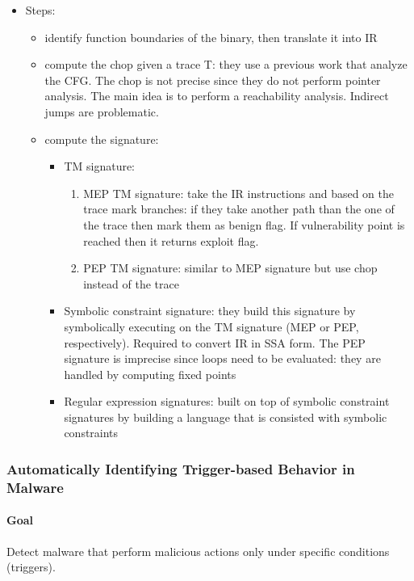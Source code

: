 \begin{itemize}
\begin{itemize}
    \end{itemize}
  \item Steps:
    \begin{itemize}
      \item identify function boundaries of the binary, then translate it into IR
      \item compute the chop given a trace T: they use a previous work that analyze the CFG. The chop is not precise since they do not perform pointer analysis. The main idea is to perform a reachability analysis. Indirect jumps are problematic.
      \item compute the signature:
        \begin{itemize}
          \item TM signature:
            \begin{enumerate}
              \item MEP TM signature:
              take the IR instructions and based on the trace mark branches: if they take another path than the one of the trace then mark them as benign flag. If vulnerability point is reached then it returns exploit flag.
              \item PEP TM signature: similar to MEP signature but use chop instead of the trace
            \end{enumerate}
          \item Symbolic constraint signature: they build this signature by symbolically executing on the TM signature (MEP or PEP, respectively). Required to convert IR in SSA form. The PEP signature is imprecise since loops need to be evaluated: they are handled by computing fixed points
          \item Regular expression signatures: built on top of symbolic constraint signatures by building a language that is consisted with symbolic constraints
        \end{itemize}
    \end{itemize}
\end{itemize}

\subsubsection{\cite{MineSweeper-BOTNET08} Automatically Identifying Trigger-based Behavior in Malware} 

\paragraph{Goal}
Detect malware that perform malicious actions only under specific conditions (triggers).

